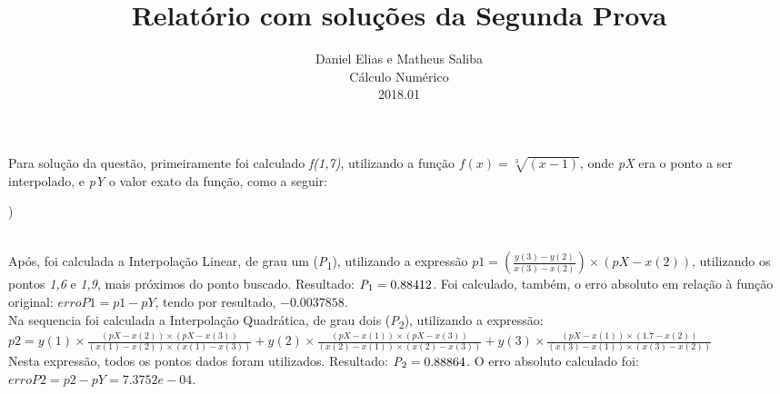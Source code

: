 \documentclass[12pt]{article}
\newenvironment{question}[2][Questão]{\begin{trivlist}
\item[\hskip \labelsep {\bfseries #1}\hskip \labelsep {\bfseries #2.}]}{\end{trivlist}}
\begin{document}
 
 
\title{Relatório com soluções da Segunda Prova}%
\author{Daniel Elias e Matheus Saliba\\ %
Cálculo Numérico\\
2018.01} %
 
\maketitle
\newpage
\begin{question}{1}
	Para solução da questão, primeiramente foi calculado \textit{f(1,7)}, utilizando a função $f(x) = \sqrt[3]{(x - 1)}$, onde \textit{pX} era o ponto a ser interpolado, e \textit{pY} o valor exato da função, como a seguir:\\
	\begin{algorithm}
		\begin{algorithmic}[1]
			)
			 
		\end{algorithmic}
	\end{algorithm} \\
	Após, foi calculada a Interpolação Linear, de grau um (\textit{P}\textsubscript{1}), utilizando a expressão $p1 = (\frac{y(3) - y(2)}{x(3) - x(2)}) \times (pX - x(2))$, utilizando os pontos \textit{1,6} e \textit{1,9}, mais próximos do ponto buscado. Resultado: $\textit{P}\textsubscript{1} = 0.88412$. Foi calculado, também, o erro absoluto em relação à função original: $erroP1 = p1 - pY$, tendo por resultado, $-0.0037858$.\\
	
	Na sequencia foi calculada a Interpolação Quadrática, de grau dois (\textit{P}\textsubscript{2}), utilizando a expressão: \\
	
	$p2 = y(1) \times \frac{(pX - x(2)) \times (pX - x(3))}{(x(1) - x(2)) \times (x(1) - x(3))} + y(2) \times \frac{(pX - x(1)) \times (pX - x(3))}{(x(2) - x(1)) \times (x(2) - x(3))} + y(3) \times \frac{(pX - x(1)) \times (1.7 - x(2))}{(x(3) - x(1)) \times (x(3) - x(2))} $ \\
	
	Nesta expressão, todos os pontos dados foram utilizados. Resultado: $\textit{P}\textsubscript{2} = 0.88864$. O erro absoluto calculado foi: $erroP2 = p2 - pY = 7.3752e-04$. \\
	

\end{question}
\end{document}
